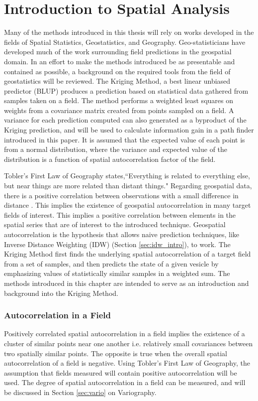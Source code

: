 \chapter{Introduction to Spatial Analysis}
Many of the methods introduced in this thesis will rely on works developed in the fields of Spatial Statistics, Geostatistics, and Geography. Geo-statisticians have developed much of the work surrounding field predictions in the geospatial domain. In an effort to make the methods introduced be as presentable and contained as possible, a background on the required tools from the field of geostatistics will be reviewed. The Kriging Method, a best linear unbiased predictor (BLUP) produces a prediction based on statistical data gathered from samples taken on a field. The method performs a weighted least squares on weights from a covariance matrix created from points sampled on a field. A variance for each prediction computed can also generated as a byproduct of the Kriging prediction, and will be used to calculate information gain in a path finder introduced in this paper. It is assumed that the expected value of each point is from a normal distribution, where the variance and expected value of the distribution is a function of spatial autocorrelation factor of the field.

Tobler's First Law of Geography \cite{tobler:first_law} states,``Everything is related to everything else, but near things are more related than distant things." Regarding geospatial data, there is a positive correlation between observations with a small difference in distance \cite{miller:on_toblers_first_law}. This implies the existence of geospatial autocorrelation in many target fields of interest. This implies a positive correlation between elements in the spatial series that are of interest to the introduced technique. Geospatial autocorrelation is the hypothesis that allows naive prediction techniques, like Inverse Distance Weighting (IDW) (Section \ref{sec:idw_intro}), to work. The Kriging Method first finds the underlying spatial autocorrelation of a target field from a set of samples, and then predicts the state of a given vesicle by emphasizing values of statistically similar samples in a weighted sum. The methods introduced in this chapter are intended to serve as an introduction and background into the Kriging Method.

\subsection{Autocorrelation in a Field}
Positively correlated spatial autocorrelation in a field implies the existence of a cluster of similar points near one another i.e. relatively small covariances between two spatially similar points. The opposite is true when the overall spatial autocorrelation of a field is negative. Using Tobler's First Law of Geography, the assumption that fields measured will contain positive autocorrelation will be used. The degree of spatial autocorrelation in a field can be measured, and will be discussed in Section \ref{sec:vario} on Variography.

